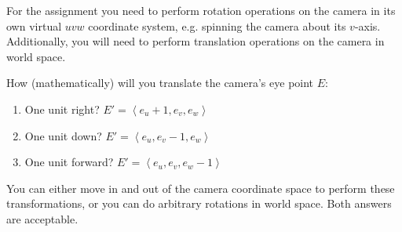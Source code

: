 \documentclass[10pt,twocolumn]{article}
\begin{document}
\noindent For the assignment you need to perform rotation operations on the camera in its own virtual $uvw$ coordinate system, e.g. spinning the camera about its $v$-axis. Additionally, you will need to perform translation operations on the camera in world space.
\begin{framed}
\noindent {\bf [1/2 pt. each]} How (mathematically) will you translate the camera's eye point $E$:
\begin{enumerate}
\item One unit right? $E' = \left<e_u + 1, e_v, e_w\right>$\\
\item One unit down? $E' = \left<e_u, e_v - 1, e_w \right>$\\
\item One unit forward? $E' = \left<e_u, e_v, e_w - 1 \right>$\\
\end{enumerate}
\end{framed}

\noindent You can either move in and out of the camera coordinate space to perform these transformations, or you can do arbitrary rotations in world space. Both answers are acceptable.
\end{document}
